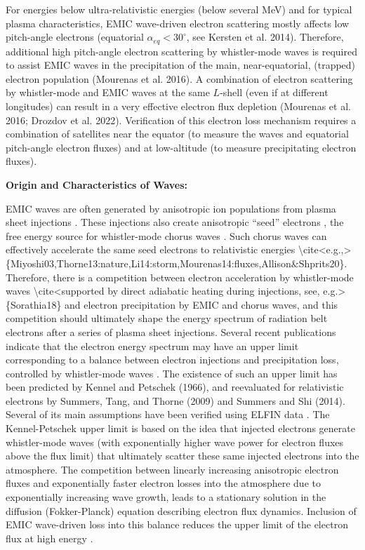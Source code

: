 \documentclass[
  letterpaper,
  DIV=11,
  numbers=noendperiod]{scrartcl}
\begin{document}
For energies below ultra-relativistic energies (below several MeV) and for typical plasma characteristics, EMIC wave-driven electron scattering mostly affects low pitch-angle electrons (equatorial \(\alpha_{eq}<30^\circ\), see Kersten et al. 2014). Therefore, additional high pitch-angle electron scattering by whistler-mode waves is required to assist EMIC waves in the precipitation of the main, near-equatorial, (trapped) electron population (Mourenas et al. 2016). A combination of electron scattering by whistler-mode and EMIC waves at the same \(L\)-shell (even if at different longitudes) can result in a very effective electron flux depletion (Mourenas et al. 2016; Drozdov et al. 2022). Verification of this electron loss mechanism requires a combination of satellites near the equator (to measure the waves and equatorial pitch-angle electron fluxes) and at low-altitude (to measure precipitating electron fluxes).

\textbf{Origin and Characteristics of Waves:}

EMIC waves are often generated by anisotropic ion populations from plasma sheet injections \cite{Jun19:emic,Jun21:emic}. These injections also create anisotropic ``seed'' electrons \cite{Miyoshi13,Jaynes15:seedelectrons}, the free energy source for whistler-mode chorus waves \cite{Tao11,Fu14:radiation_belts,Zhang18:whistlers&injections}. Such chorus waves can effectively accelerate the same seed electrons to relativistic energies \textbackslash cite\textless e.g.,\textgreater\{Miyoshi03,Thorne13:nature,Li14:storm,Mourenas14:fluxes,Allison\&Shprits20\}. Therefore, there is a competition between electron acceleration by whistler-mode waves \textbackslash cite\textless supported by direct adiabatic heating during injections, see, e.g.\textgreater\{Sorathia18\} and electron precipitation by EMIC and chorus waves, and this competition should ultimately shape the energy spectrum of radiation belt electrons after a series of plasma sheet injections. Several recent publications indicate that the electron energy spectrum may have an upper limit corresponding to a balance between electron injections and precipitation loss, controlled by whistler-mode waves \cite{Olifer21, Olifer22, Walton23}. The existence of such an upper limit has been predicted by Kennel and Petschek (1966), and reevaluated for relativistic electrons by Summers, Tang, and Thorne (2009) and Summers and Shi (2014). Several of its main assumptions have been verified using ELFIN data \cite{Mourenas24}. The Kennel-Petschek upper limit is based on the idea that injected electrons generate whistler-mode waves (with exponentially higher wave power for electron fluxes above the flux limit) that ultimately scatter these same injected electrons into the atmosphere. The competition between linearly increasing anisotropic electron fluxes and exponentially faster electron losses into the atmosphere due to exponentially increasing wave growth, leads to a stationary solution in the diffusion (Fokker-Planck) equation describing electron flux dynamics. Inclusion of EMIC wave-driven loss into this balance reduces the upper limit of the electron flux at high energy \cite{Mourenas22:ExtremeSpectra, Summers04B}.
\end{document}
